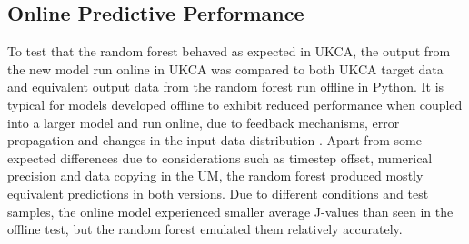 \documentclass[journal abbreviation, manuscript]{copernicus}
\begin{document}
\subsection{Online Predictive Performance}

To test that the random forest behaved as expected in UKCA, the output from the new model run online in UKCA was compared to both UKCA target data and equivalent output data from the random forest run offline in Python. It is typical for models developed offline to exhibit reduced performance when coupled into a larger model and run online, due to feedback mechanisms, error propagation and changes in the input data distribution \citep{stensrud_parameterization_2007}. Apart from some expected differences due to considerations such as timestep offset, numerical precision and data copying in the UM, the random forest produced mostly equivalent predictions in both versions. Due to different conditions and test samples, the online model experienced smaller average J-values than seen in the offline test, but the random forest emulated them relatively accurately.
\end{document}

